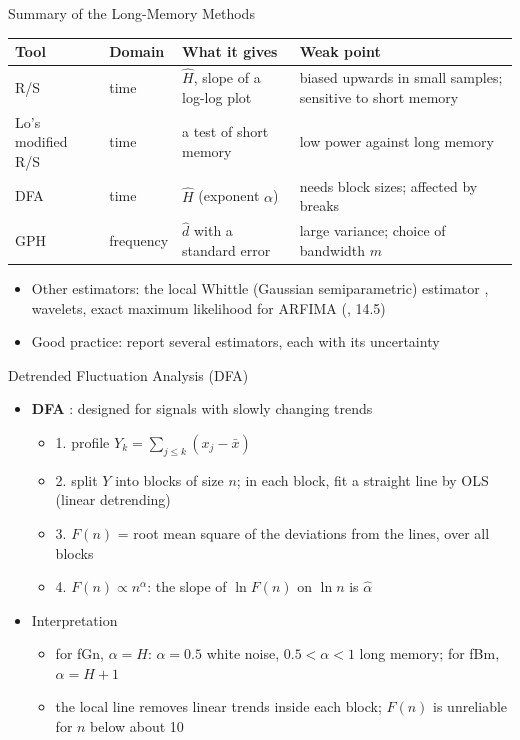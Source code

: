 \begin{frame}{Summary of the Long-Memory Methods}
\itemsize{\small}
\begin{center}
\scriptsize
\begin{tabular}{>{\raggedright\arraybackslash}p{2.0cm}>{\raggedright\arraybackslash}p{1.7cm}>{\raggedright\arraybackslash}p{3.4cm}>{\raggedright\arraybackslash}p{3.6cm}}
\toprule
\textbf{Tool} & \textbf{Domain} & \textbf{What it gives} & \textbf{Weak point} \\
\midrule
R/S & time & $\hat H$, slope of a log-log plot & biased upwards in small samples; sensitive to short memory \\
Lo's modified R/S & time & a test of short memory & low power against long memory \\
DFA & time & $\hat H$ (exponent $\alpha$) & needs block sizes; affected by breaks \\
GPH & frequency & $\hat d$ with a standard error & large variance; choice of bandwidth $m$ \\
\bottomrule
\end{tabular}
\end{center}
\begin{itemize}
    \item Other estimators: the local Whittle (Gaussian semiparametric) estimator , wavelets, exact maximum likelihood for ARFIMA (, 14.5)
    \item Good practice: report several estimators, each with its uncertainty
\end{itemize}
\end{frame}

\begin{frame}{Detrended Fluctuation Analysis (DFA)}
\itemsize{\small}
\begin{itemize}
    \item \textbf{DFA} : designed for signals with slowly changing trends
    \begin{itemize}
        \item 1. profile $Y_k = \sum_{j \le k}(x_j - \bar x)$
        \item 2. split $Y$ into blocks of size $n$; in each block, fit a straight line by OLS (linear detrending)
        \item 3. $F(n)$ = root mean square of the deviations from the lines, over all blocks
        \item 4. $F(n) \propto n^{\alpha}$: the slope of $\ln F(n)$ on $\ln n$ is $\hat\alpha$
    \end{itemize}
    \item Interpretation
    \begin{itemize}
        \item for fGn, $\alpha = H$: $\alpha = 0.5$ white noise, $0.5 < \alpha < 1$ long memory; for fBm, $\alpha = H + 1$
        \item the local line removes linear trends inside each block; $F(n)$ is unreliable for $n$ below about 10 
    \end{itemize}
\end{itemize}
\end{frame}

